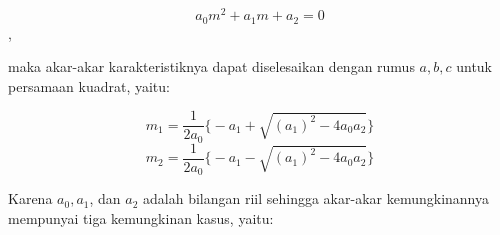 \begin{displaymath} a_0 m^{2} + a_1 m + a_2 = 0 \end{displaymath}, 

maka akar-akar karakteristiknya dapat diselesaikan dengan rumus \begin{math} a, b, c \end{math} untuk persamaan kuadrat, yaitu:

\begin{equation} m_1 = \dfrac{1}{2 a_0} \bigg\{ - a_1 + \sqrt{(a_1)^{2} - 4 a_0 a_2} \bigg\}\end{equation} 
\begin{equation} m_2 = \dfrac{1}{2 a_0} \bigg\{ - a_1 - \sqrt{(a_1)^{2} - 4 a_0 a_2} \bigg\}\end{equation}

Karena \begin{math} a_0, a_1 \end{math}, dan \begin{math} a_2 \end{math} adalah bilangan riil sehingga akar-akar kemungkinannya mempunyai tiga kemungkinan kasus, yaitu:


